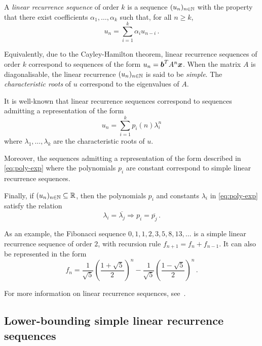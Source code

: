 A \emph{linear recurrence sequence} of order $k$ is a sequence $(u_{n})_{n \in \mathbb{N}}$ with the property that there exist coefficients $\alpha_{1}, \ldots, \alpha_{k}$ such that, for all $n \geq k$,
\begin{equation*}
  u_{n} = \sum\limits_{i=1}^{k} \alpha_{i} u_{n-i}\, .
\end{equation*}

Equivalently, due to the Cayley-Hamilton theorem, linear recurrence sequences of order $k$ correspond to sequences of the form $u_{n} = \boldsymbol{b}^{T} A^{n} \boldsymbol{x}$. When the matrix $A$ is diagonalisable, the linear recurrence $(u_{n})_{n \in \mathbb{N}}$ is said to be \emph{simple}. The \emph{characteristic roots} of $u$ correspond to the eigenvalues of $A$.

It is well-known that linear recurrence sequences correspond to sequences admitting a representation of the form
\begin{equation}
  \label{eq:poly-exp}
  u_{n} = \sum\limits_{i=1}^{k} p_{i}(n) \lambda_{i}^{n}
\end{equation}
where $\lambda_{1}, \ldots, \lambda_{k}$ are the characteristic roots of $u$.

Moreover, the sequences admitting a representation of the form described in \cref{eq:poly-exp} where the polynomials $p_{i}$ are constant correspond to simple linear recurrence sequences.

Finally, if $(u_{n})_{n \in \mathbb{N}} \subseteq \mathbb{R}$, then the polynomials $p_{i}$ and constants $\lambda_{i}$ in \cref{eq:poly-exp} satisfy the relation
\begin{equation*}
  \label{eq:real_property}
  \lambda_{i} = \overline{\lambda_{j}} \Rightarrow p_{i} = \overline{p_{j}} \, .
\end{equation*}

As an example, the Fibonacci sequence $0, 1, 1, 2, 3, 5, 8, 13, \ldots$ is a simple linear recurrence sequence of order $2$, with recursion rule $f_{n+1} = f_{n} + f_{n-1}$. It can also be represented in the form
\begin{equation*}
  f_{n} = \frac{1}{\sqrt{5}} \left(\frac{1+\sqrt{5}}{2} \right)^{n} - \frac{1}{\sqrt{5}} \left( \frac{1-\sqrt{5}}{2} \right)^{n} \, .
\end{equation*}

For more information on linear recurrence sequences, see~\cite{BOOK}.

\subsection{Lower-bounding simple linear recurrence sequences}
\label{sec:s-units-app}

